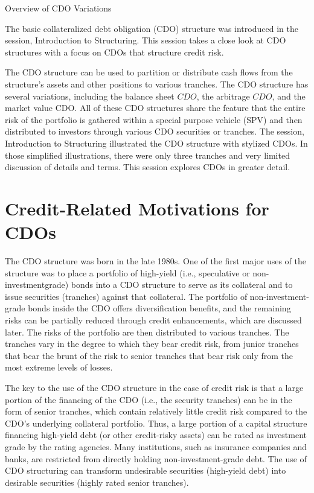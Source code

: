 \documentclass[11pt]{article}
\begin{document}
Overview of CDO Variations

The basic collateralized debt obligation (CDO) structure was introduced in the session, Introduction to Structuring. This session takes a close look at CDO structures with a focus on CDOs that structure credit risk.

The CDO structure can be used to partition or distribute cash flows from the structure's assets and other positions to various tranches. The CDO structure has several variations, including the balance sheet $C D O$, the arbitrage $C D O$, and the market value CDO. All of these CDO structures share the feature that the entire risk of the portfolio is gathered within a special purpose vehicle (SPV) and then distributed to investors through various CDO securities or tranches. The session, Introduction to Structuring illustrated the CDO structure with stylized CDOs. In those simplified illustrations, there were only three tranches and very limited discussion of details and terms. This session explores CDOs in greater detail.

\section*{Credit-Related Motivations for CDOs}
The CDO structure was born in the late 1980s. One of the first major uses of the structure was to place a portfolio of high-yield (i.e., speculative or non-investmentgrade) bonds into a CDO structure to serve as its collateral and to issue securities (tranches) against that collateral. The portfolio of non-investment-grade bonds inside the CDO offers diversification benefits, and the remaining risks can be partially reduced through credit enhancements, which are discussed later. The risks of the portfolio are then distributed to various tranches. The tranches vary in the degree to which they bear credit risk, from junior tranches that bear the brunt of the risk to senior tranches that bear risk only from the most extreme levels of losses.

The key to the use of the CDO structure in the case of credit risk is that a large portion of the financing of the CDO (i.e., the security tranches) can be in the form of senior tranches, which contain relatively little credit risk compared to the CDO's underlying collateral portfolio. Thus, a large portion of a capital structure financing high-yield debt (or other credit-risky assets) can be rated as investment grade by the rating agencies. Many institutions, such as insurance companies and banks, are restricted from directly holding non-investment-grade debt. The use of CDO structuring can transform undesirable securities (high-yield debt) into desirable securities (highly rated senior tranches).
\end{document}
